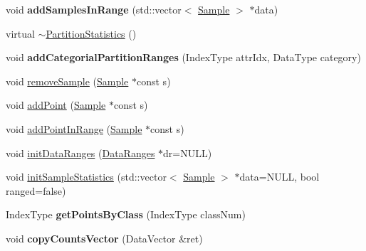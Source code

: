 \begin{DoxyCompactItemize}
\item 
\hypertarget{classffactory_1_1_partition_statistics_a7b57d257f59718ede48cf21e94da8b8f}{void {\bfseries add\-Samples\-In\-Range} (std\-::vector$<$ \hyperlink{classffactory_1_1_sample}{Sample} $>$ $\ast$data)}\label{classffactory_1_1_partition_statistics_a7b57d257f59718ede48cf21e94da8b8f}

\item 
virtual \hyperlink{classffactory_1_1_partition_statistics_a4c838e480cc0fb6c9ac93e9abf0e9613}{$\sim$\-Partition\-Statistics} ()
\item 
\hypertarget{classffactory_1_1_partition_statistics_a6e953b946f5a7fd73210524c4e76a2a7}{void {\bfseries add\-Categorial\-Partition\-Ranges} (Index\-Type attr\-Idx, Data\-Type category)}\label{classffactory_1_1_partition_statistics_a6e953b946f5a7fd73210524c4e76a2a7}

\item 
void \hyperlink{classffactory_1_1_partition_statistics_a991b8a7b65034632781fb1650654e7d0}{remove\-Sample} (\hyperlink{classffactory_1_1_sample}{Sample} $\ast$const s)
\item 
void \hyperlink{classffactory_1_1_partition_statistics_a340f7b5f795fcdbe2d448ccfce86a32e}{add\-Point} (\hyperlink{classffactory_1_1_sample}{Sample} $\ast$const s)
\item 
void \hyperlink{classffactory_1_1_partition_statistics_a1acdc107481f49362175355b8530e32c}{add\-Point\-In\-Range} (\hyperlink{classffactory_1_1_sample}{Sample} $\ast$const s)
\item 
void \hyperlink{classffactory_1_1_partition_statistics_afe3bee838f0967a7840573eafb9194d8}{init\-Data\-Ranges} (\hyperlink{classffactory_1_1_data_ranges}{Data\-Ranges} $\ast$dr=N\-U\-L\-L)
\item 
void \hyperlink{classffactory_1_1_partition_statistics_a73651a96a6221a45e850876241563ee6}{init\-Sample\-Statistics} (std\-::vector$<$ \hyperlink{classffactory_1_1_sample}{Sample} $>$ $\ast$data=N\-U\-L\-L, bool ranged=false)
\item 
\hypertarget{classffactory_1_1_partition_statistics_a22629165f1a25adf4aadff726c6a9865}{Index\-Type {\bfseries get\-Points\-By\-Class} (Index\-Type class\-Num)}\label{classffactory_1_1_partition_statistics_a22629165f1a25adf4aadff726c6a9865}

\item 
\hypertarget{classffactory_1_1_partition_statistics_a5428078a79dd269c83dd3946da040a61}{void {\bfseries copy\-Counts\-Vector} (Data\-Vector \&ret)}\label{classffactory_1_1_partition_statistics_a5428078a79dd269c83dd3946da040a61}


\end{DoxyCompactItemize}
